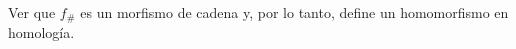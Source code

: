 \begin{ejercicio}
    Ver que $f_\#$ es un morfismo de cadena y, por lo tanto, define un homomorfismo en homología.
\end{ejercicio}

\begin{demostracion}

\end{demostracion}
